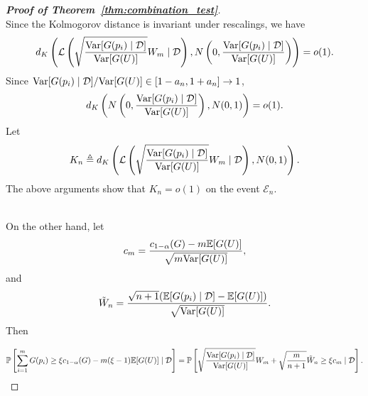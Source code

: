 \documentclass[11pt]{article}
\newcommand{\Var}{\textnormal{Var}}
\def\E{\mathbb{E}}
\renewcommand{\P}{\mathbb{P}}
\begin{document}
\begin{proof}[\textbf{Proof of Theorem~\ref{thm:combination_test}}]
\begin{equation*}
\end{equation*}
Since the Kolmogorov distance is invariant under rescalings, we have
\[d_{K}\left(\mathcal{L}\left(\sqrt{\frac{\Var[G(p_i)\mid \mathcal{D}]}{\Var[G(U)]}} W_{m}\mid \mathcal{D}\right), N\left(0, \frac{\Var[G(p_i)\mid \mathcal{D}]}{\Var[G(U)]}\right)\right) = o(1).\]
Since $\Var[G(p_i)\mid \mathcal{D}]/\Var[G(U)]\in [1 - a_{n}, 1 + a_{n}]\rightarrow 1$,
\[d_{K}\left( N\left(0, \frac{\Var[G(p_i)\mid \mathcal{D}]}{\Var[G(U)]}\right), N(0, 1)\right) = o(1).\]
Let 
\begin{equation}\label{eq:conditional_CLT}
  K_{n}\triangleq d_{K}\left(\mathcal{L}\left(\sqrt{\frac{\Var[G(p_i)\mid \mathcal{D}]}{\Var[G(U)]}} W_{m}\mid \mathcal{D}\right), N(0, 1)\right).
\end{equation}
The above arguments show that $K_{n} = o(1)$ on the event $\mathcal{E}_{n}$. 

~\\
\noindent On the other hand, let 
\begin{equation*}
   c_{m} = \frac{c_{1 - \alpha}(G) - m\E[G(U)]}{\sqrt{m\Var[G(U)]}},
\end{equation*}
and 
\begin{equation*}
\tilde{W}_{n} = \frac{\sqrt{n + 1}(\E[G(p_i)\mid \mathcal{D}] - \E[G(U)])}{\sqrt{\Var[G(U)]}}.
\end{equation*}
Then

\begin{align*}
\P\left[\sum_{i=1}^{m}G(p_i)\ge \xi c_{1 - \alpha}(G) - m(\xi - 1)\E[G(U)]\mid \mathcal{D}\right] = \P\left[\sqrt{\frac{\Var[G(p_i)\mid \mathcal{D}]}{\Var[G(U)]}}W_{m} + \sqrt{\frac{m}{n + 1}}\tilde{W}_{n}\ge \xi c_{m}\mid \mathcal{D}\right].
\end{align*}


\end{proof}
\end{document}
